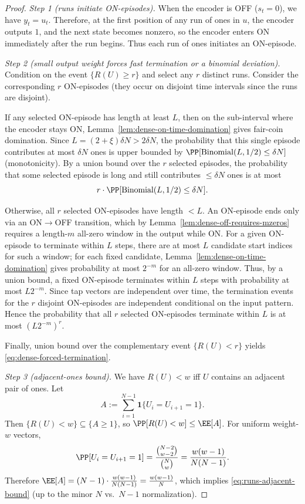 \begin{proof}
\emph{Step 1 (runs initiate ON-episodes).}
When the encoder is OFF ($s_t=0$), we have $y_t=u_t$.
Therefore, at the first position of any run of ones in $u$, the encoder outputs $1$, and the next state becomes nonzero,
so the encoder enters ON immediately after the run begins.
Thus each run of ones initiates an ON-episode.

\emph{Step 2 (small output weight forces fast termination or a binomial deviation).}
Condition on the event $\{R(U)\ge r\}$ and select any $r$ distinct runs.
Consider the corresponding $r$ ON-episodes (they occur on disjoint time intervals since the runs are disjoint).

If any selected ON-episode has length at least $L$, then on the sub-interval where the encoder stays ON,
Lemma~\ref{lem:dense-on-time-domination} gives fair-coin domination.
Since $L=(2+\xi)\delta N>2\delta N$, the probability that this single episode contributes at most $\delta N$ ones is
upper bounded by $\PP[\mathrm{Binomial}(L,1/2)\le \delta N]$ (monotonicity).
By a union bound over the $r$ selected episodes, the probability that some selected episode is long and still contributes
$\le \delta N$ ones is at most
\[
r\cdot \PP[\mathrm{Binomial}(L,1/2)\le \delta N].
\]

Otherwise, all $r$ selected ON-episodes have length $<L$.
An ON-episode ends only via an ON$\to$OFF transition, which by Lemma~\ref{lem:dense-off-requires-mzeros} requires a
length-$m$ all-zero window in the output while ON.
For a given ON-episode to terminate within $L$ steps, there are at most $L$ candidate start indices for such a window;
for each fixed candidate, Lemma~\ref{lem:dense-on-time-domination} gives probability at most \(2^{-m}\) for an
all-zero window.
Thus, by a union bound, a fixed ON-episode terminates within $L$ steps with probability at most $L2^{-m}$.
Since tap vectors are independent over time, the termination events for the $r$ disjoint ON-episodes are independent
conditional on the input pattern. Hence the probability that all $r$ selected ON-episodes terminate within $L$ is
at most $(L2^{-m})^r$.

Finally, union bound over the complementary event $\{R(U)<r\}$ yields \eqref{eq:dense-forced-termination}.

\emph{Step 3 (adjacent-ones bound).}
We have $R(U)<w$ iff $U$ contains an adjacent pair of ones.
Let
\[
A:=\sum_{i=1}^{N-1}\mathbf{1}\{U_i=U_{i+1}=1\}.
\]
Then $\{R(U)<w\}\subseteq\{A\ge 1\}$, so $\PP[R(U)<w]\le \EE[A]$.
For uniform weight-$w$ vectors,
\[
\PP[U_i=U_{i+1}=1]=\frac{\binom{N-2}{w-2}}{\binom{N}{w}}=\frac{w(w-1)}{N(N-1)}.
\]
Therefore $\EE[A]=(N-1)\cdot \frac{w(w-1)}{N(N-1)}=\frac{w(w-1)}{N}$, which implies \eqref{eq:runs-adjacent-bound}
(up to the minor $N$ vs.\ $N-1$ normalization).
\end{proof}


